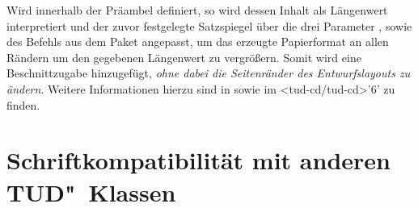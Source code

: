 \begin{DeclareEntity}{}
\begin{NoIndexDefault}
\begin{Declaration}
Wird  innerhalb der Präambel definiert, so wird dessen 
Inhalt als Längenwert interpretiert und der zuvor festgelegte Satzspiegel über 
die drei Parameter , 
 sowie 
 des Befehls  aus dem 
Paket  angepasst, um das erzeugte Papierformat an allen 
Rändern um den gegebenen Längenwert zu vergrößern. Somit wird eine 
Beschnittzugabe hinzugefügt, \emph{ohne dabei die Seitenränder des 
Entwurfslayouts zu ändern}. Weitere Informationen hierzu sind in 
 sowie im \GitHubRepo<tud-cd/tud-cd>'6' zu finden.
\end{Declaration}
%
\end{NoIndexDefault}
\end{DeclareEntity}



\section[%
  Das Paket \Package{fix-tudscrfonts} -- Schriftkompatibilität%
]{%
  Schriftkompatibilität mit anderen TUD"~Klassen%
}

